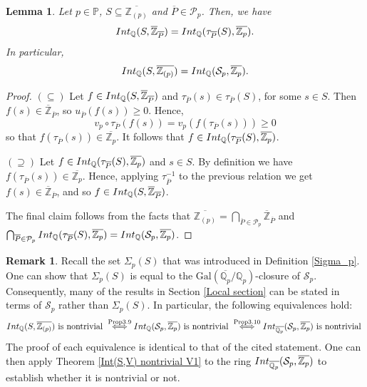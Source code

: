 \documentclass{article}
\newtheorem{Lem}[equation]{Lemma}
\theoremstyle{definition}\newtheorem{Def}[equation]{Definition}
\newtheorem{Rem}[equation]{Remark}
\theoremstyle{definition}\newtheorem{Ques}[equation]{Question}
\theoremstyle{definition}\newtheorem{Conj}[equation]{Conjecture}
\theoremstyle{definition}\newtheorem{Not}[equation]{Notation}
\newcommand{\Q}{\mathbb{Q}}
\newcommand{\oZ}{\overline{\Z}}
\newcommand{\oP}{\overline{P}}
\newcommand{\Z}{\mathbb{Z}}
\newcommand{\oZp}{\overline{\Z_p}}
\newcommand{\oQp}{\overline{\Q_p}}
\newcommand{\Int}{\textnormal{Int}}
\newcommand{\IntQ}{\Int_{\Q}}
\newcommand{\Gal}{\text{Gal}}
\newcommand{\PP}{\mathbb{P}}
\newcommand{\mcP}{\mathcal{P}}
\numberwithin{equation}{section}
\begin{document}
\begin{Lem}\label{transfer to oZp}
Let $p\in\PP$, $S \subseteq \overline{\Z_{(p)}}$ and $\oP\in\mathcal{P}_p$. Then, we have
$$\IntQ(S,\oZ_{\oP})=\IntQ(\tau_{\oP}(S),\oZp).$$ 
In particular,
$$\IntQ(S,\overline{\Z_{(p)}})=\IntQ(\mathcal{S}_p,\oZp).$$ 
\end{Lem}
\begin{proof}
$(\subseteq)$ Let $f\in\IntQ(S,\oZ_{\oP})$ and $\tau_{\oP}(s)\in \tau_{\oP}(S)$, for some $s\in S$. Then $f(s)\in\oZ_{\oP}$, so $u_{\oP}(f(s))\geq0$. Hence, $$v_p\circ \tau_{\oP}(f(s))=v_p(f(\tau_{\oP}(s)))\geq0$$
so that $f(\tau_{\oP}(s))\in\oZp$. It follows that $f\in\IntQ(\tau_{\oP}(S),\oZp)$.

$(\supseteq)$ Let $f\in\IntQ(\tau_{\oP}(S),\oZp)$ and $s\in S$. By definition we have $f(\tau_{\oP}(s))\in\oZp$. Hence, applying $\tau_{\oP}^{-1}$ to the previous relation we get $f(s)\in\oZ_{\oP}$, and so $f\in\IntQ(S,\oZ_{\oP})$.

The final claim follows from the facts that $\overline{\Z_{(p)}} = \bigcap_{\oP\in\mcP_p} \oZ_{\oP}$ and $\bigcap_{\oP\in\mcP_p}\IntQ(\tau_{\oP}(S),\oZp)=\IntQ(\mathcal{S}_p,\oZp)$.
\end{proof}

\begin{Rem}\label{S_p remark}
Recall the set $\Sigma_p(S)$ that was introduced in Definition \ref{Sigma_p}. One can show that $\Sigma_p(S)$ is equal to the $\Gal(\oQp/\Q_p)$-closure of $\mathcal{S}_p$. Consequently, many of the results in Section \ref{Local section} can be stated in terms of $\mathcal{S}_p$ rather than $\Sigma_p(S)$. In particular, the following equivalences hold:
$$\IntQ(S,\overline{\Z_{(p)}})\text{ is nontrivial }\stackrel{\text{Prop} 3.9}{\Longleftrightarrow}\IntQ(\mathcal{S}_p,\oZp)\text{ is nontrivial }\stackrel{\text{Prop} 3.10}{\Longleftrightarrow}\Int_{\oQp}(\mathcal{S}_p,\oZp)\text{ is nontrivial }$$
The proof of each equivalence is identical to that of the cited statement. One can then apply Theorem \ref{Int(S,V) nontrivial V1} to the ring $\Int_{\oQp}(\mathcal{S}_p,\oZp)$ to establish whether it is nontrivial or not.
\end{Rem}
\end{document}
